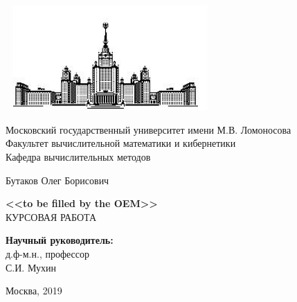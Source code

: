\documentclass[14pt, a4paper, fleqn]{extreport}
\begin{document}
    \newcommand{\round}[1]{\stackrel{o}{#1}}
    \newcommand{\grad}{\text{grad }}
    \renewcommand{\div}{\text{div }}
    \newcommand{\rot}{\text{rot }}
    \newcommand{\hess}{\text{hess }}
    \newcommand{\laplace}{\mathop{}\!\mathbin\bigtriangleup}
        
    \begin{titlepage}
    \begin{center}
        \includegraphics[width=8cm, height=4cm]{MSU}
    \end{center}
    \begin{center}
            Московский государственный университет имени М.В. Ломоносова\\
            \vspace{0.1 cm}
            Факультет вычислительной математики и кибернетики\\
            \vspace{0.1 cm}
            Кафедра вычислительных методов
            
            \vspace{3cm}
            {\Large Бутаков Олег Борисович }\\
            \vspace{1cm}
            
            {\bf\LARGE <<to be filled by the OEM>>}\\ \vspace{2cm}
            КУРСОВАЯ РАБОТА
    \end{center}
    \vspace{2cm}
    \begin{flushright}
        {\bf Научный руководитель:}\\
             д.ф-м.н., профессор \\
             С.И. Мухин
    \end{flushright}        
    \vspace{4.5cm}
    \centerline {Москва, 2019}
    \end{titlepage}
    
    \tableofcontents
    \clearpage
    
\end{document}
